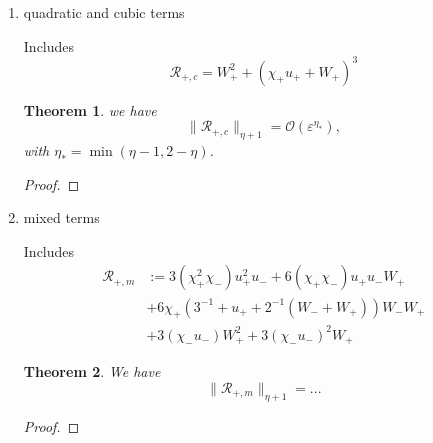 \documentclass[letterpaper,11pt]{article}
\newcommand{\rmO}{\mathcal{O}}
\newcommand{\eps}{\varepsilon}
\numberwithin{equation}{section}
\theoremstyle{plain}
\newtheorem{theorem}{Theorem}[section]
\begin{document}
\begin{enumerate}
\begin{itemize}
\begin{enumerate}
\begin{proof}
\end{proof}

\item quadratic and cubic terms

Includes
\[
\mathcal{R}_{+,c} = W_+^2 + (\chi_+u_+ + W_+)^3
\]

\begin{theorem}
we have
\[
\| \mathcal{R}_{+,c} \|_{\eta+1} = \rmO(\eps^{\eta_*}),
\]
with $\eta_* = \min(\eta-1, 2-\eta)$.
\end{theorem}

\begin{proof}

\end{proof}
\item mixed terms

Includes
\begin{align*}
\mathcal{R}_{+,m} &:=3(\chi_+^2\chi_-)u_+^2u_- + 6(\chi_+\chi_-)u_+ u_- W_+\\
&+6\chi_+(3^{-1} + u_+ + 2^{-1}(W_-+W_+))W_-W_+\\
&+ 3(\chi_-u_-)W_+^2 + 3(\chi_-u_-)^2W_+
\end{align*}

 \begin{theorem}
 We have
 \[
 \|\mathcal{R}_{+,m}\|_{\eta+1} = ...
 \]
 \end{theorem}
 
 \begin{proof}

 \end{proof}
\end{enumerate}

\end{itemize}

\end{enumerate}



\end{document}
